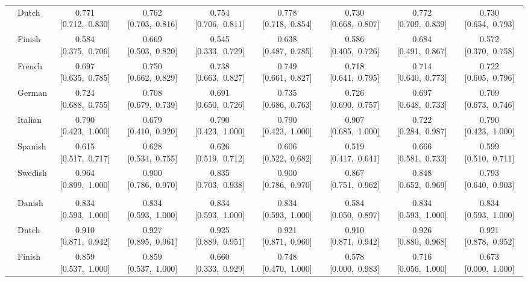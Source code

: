 \begin{longtable}[t]{llccccccc}
 & Dutch & 0.771 [0.712,~0.830] & 0.762 [0.703,~0.816] & 0.754 [0.706,~0.811] & 0.778 [0.718,~0.854] & 0.730 [0.668,~0.807] & 0.772 [0.709,~0.839] & 0.730 [0.654,~0.793]\\

 & Finish & 0.584 [0.375,~0.706] & 0.669 [0.503,~0.820] & 0.545 [0.333,~0.729] & 0.638 [0.487,~0.785] & 0.586 [0.405,~0.726] & 0.684 [0.491,~0.867] & 0.572 [0.370,~0.758]\\

 & French & 0.697 [0.635,~0.785] & 0.750 [0.662,~0.829] & 0.738 [0.663,~0.827] & 0.749 [0.661,~0.827] & 0.718 [0.641,~0.795] & 0.714 [0.640,~0.773] & 0.722 [0.605,~0.796]\\

 & German & 0.724 [0.688,~0.755] & 0.708 [0.679,~0.739] & 0.691 [0.650,~0.726] & 0.735 [0.686,~0.763] & 0.726 [0.690,~0.757] & 0.697 [0.648,~0.733] & 0.709 [0.673,~0.746]\\

 & Italian & 0.790 [0.423,~1.000] & 0.679 [0.410,~0.920] & 0.790 [0.423,~1.000] & 0.790 [0.423,~1.000] & 0.907 [0.685,~1.000] & 0.722 [0.284,~0.987] & 0.790 [0.423,~1.000]\\

 & Spanish & 0.615 [0.517,~0.717] & 0.628 [0.534,~0.755] & 0.626 [0.519,~0.712] & 0.606 [0.522,~0.682] & 0.519 [0.417,~0.641] & 0.666 [0.581,~0.733] & 0.599 [0.510,~0.711]\\

 & Swedish & 0.964 [0.899,~1.000] & 0.900 [0.786,~0.970] & 0.835 [0.703,~0.938] & 0.900 [0.786,~0.970] & 0.867 [0.751,~0.962] & 0.848 [0.652,~0.969] & 0.793 [0.640,~0.903]\\

\addlinespace[3pt]
\multicolumn{9}{p{\linewidth}}{\cellcolor[HTML]{DCDCDC}{classify the stance expressed in quasi-sentences about the issue of freedom and democracy \(binary)}}\\
\addlinespace & Danish & 0.834 [0.593,~1.000] & 0.834 [0.593,~1.000] & 0.834 [0.593,~1.000] & 0.834 [0.593,~1.000] & 0.584 [0.050,~0.897] & 0.834 [0.593,~1.000] & 0.834 [0.593,~1.000]\\

 & Dutch & 0.910 [0.871,~0.942] & 0.927 [0.895,~0.961] & 0.925 [0.889,~0.951] & 0.921 [0.871,~0.960] & 0.910 [0.871,~0.942] & 0.926 [0.880,~0.968] & 0.921 [0.878,~0.952]\\

 & Finish & 0.859 [0.537,~1.000] & 0.859 [0.537,~1.000] & 0.660 [0.333,~0.929] & 0.748 [0.470,~1.000] & 0.578 [0.000,~0.983] & 0.716 [0.056,~1.000] & 0.673 [0.000,~1.000]\\


\end{longtable}
